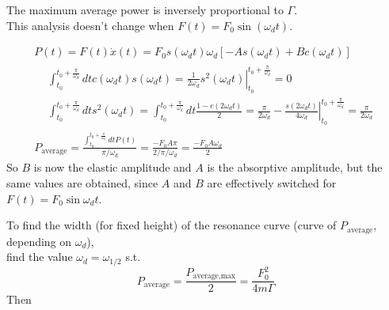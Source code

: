 The maximum average power is inversely proportional to $\Gamma$. \\

This analysis doesn't change when $F(t) = F_0 \sin{(\omega_d t)}$.

\[
\begin{gathered}
	P(t) = F(t) \dot{x}(t) = F_0 s(\omega_d t) \omega_d [ -A s(\omega_d t) + Bc(\omega_d t) ] \\
	\begin{aligned}
		& \int_{t_0}^{t_0 + \frac{\pi}{\omega_d} } dt c(\omega_dt) s(\omega_d t) = \left. \frac{1}{2 \omega_d} s^2(\omega_d t) \right|_{t_0}^{t_0 + \frac{\pi}{\omega_d} } = 0 \\
		& \int_{t_0}^{t_0 + \frac{\pi}{\omega_d} } dt s^2(\omega_dt) = \int_{t_0}^{t_0 + \frac{\pi}{\omega_d} } dt \frac{1 - c(2\omega_dt)}{2} = \frac{\pi}{2 \omega_d} - \left. \frac{s(2\omega_dt)}{ 4\omega_d} \right|_{t_0}^{t_0 + \frac{\pi}{\omega_d} } = \frac{\pi}{2\omega_d}
	\end{aligned} \\
	P_{\text{average}} = \frac{ \int_{t_0}^{t_0 + \frac{\pi}{\omega_d} } dt P(t) }{ \pi /\omega_d} = \frac{-F_0 A \pi}{2 / \pi/\omega_d} = \frac{-F_0 A \omega_d}{2}
\end{gathered}
\]
So $B$ is now the elastic amplitude and $A$ is the absorptive amplitude, but the same values are obtained, since $A$ and $B$ are effectively switched for $F(t) = F_0 \sin{\omega_d t}$.

To find the width (for fixed height) of the resonance curve (curve of $P_{\text{average}}$, depending on $\omega_d$), \\
find the value $\omega_d = \omega_{1/2}$ s.t. 
\[
P_{\text{average}} = \frac{P_{\text{average,max}}}{2} = \frac{F_0^2}{4m \Gamma}
\]
Then

